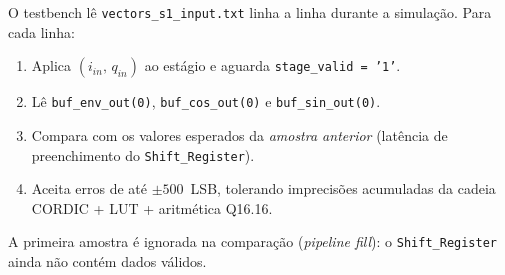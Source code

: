 \documentclass[a4paper,12pt]{article}
\begin{document}
O testbench l\^e \texttt{vectors\_s1\_input.txt} linha a linha durante a simula\c{c}\~ao.
Para cada linha:
\begin{enumerate}
    \item Aplica $(i_{in},\, q_{in})$ ao est\'agio e aguarda \texttt{stage\_valid = '1'}.
    \item L\^e \texttt{buf\_env\_out(0)}, \texttt{buf\_cos\_out(0)} e \texttt{buf\_sin\_out(0)}.
    \item Compara com os valores esperados da \textit{amostra anterior} (lat\^encia de
          preenchimento do \texttt{Shift\_Register}).
    \item Aceita erros de at\'e $\pm 500$~LSB, tolerando imprecis\~oes acumuladas da cadeia
          CORDIC + LUT + aritm\'etica Q16.16.
\end{enumerate}

A primeira amostra \'e ignorada na compara\c{c}\~ao (\textit{pipeline fill}): o
\texttt{Shift\_Register} ainda n\~ao cont\'em dados v\'alidos.
\end{document}

